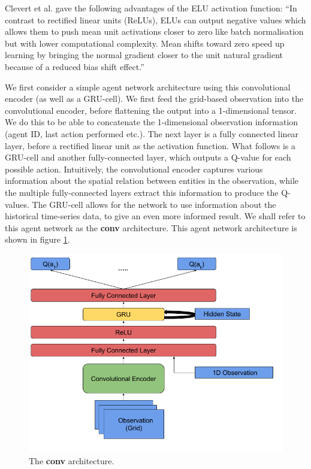 Clevert et al. \cite{elu} gave the following advantages of the ELU activation function: ``In contrast to rectified linear units (ReLUs), ELUs can output negative values which allows them to push mean unit activations closer to zero like batch normalisation but with lower computational complexity. Mean shifts toward zero speed up learning by bringing the normal gradient closer to the unit natural gradient because of a reduced bias shift effect.''


We first consider a simple agent network architecture using this convolutional encoder (as well as a GRU-cell). We first feed the grid-based observation into the convolutional encoder, before flattening the output into a 1-dimensional tensor. We do this to be able to concatenate the 1-dimensional observation information (agent ID, last action performed etc.). The next layer is a fully connected linear layer, before a rectified linear unit as the activation function. What follows is a GRU-cell and another fully-connected layer, which outputs a Q-value for each possible action. Intuitively, the convolutional encoder captures various information about the spatial relation between entities in the observation, while the multiple fully-connected layers extract this information to produce the Q-values. The GRU-cell allows for the network to use information about the historical time-series data, to give an even more informed result. We shall refer to this agent network as the \textbf{conv} architecture. This agent network architecture is shown in figure \ref{fig:conv_agent_diagram}.

\begin{figure}
    \centering
    \includegraphics[scale=0.45]{images/agent_diagrams/rnn_conv_dpdpg_agent_diagram.png}
    \caption{The \textbf{conv} architecture.}
    \label{fig:conv_agent_diagram}
\end{figure}

